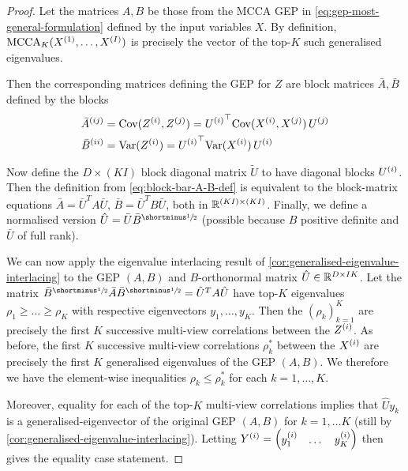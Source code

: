 \begin{proof}
    Let the matrices $A,B$ be those from the MCCA GEP in \cref{eq:gep-most-general-formulation} defined by the input variables $X$. By definition, $\operatorname{MCCA}_K(X^{(1)},\dots, X^{(I)})$ is precisely the vector of the top-$K$ such generalised eigenvalues.

    Then the corresponding matrices defining the GEP for $Z$ are block matrices $\bar{A}, \bar{B}$ defined by the blocks
    \begin{equation}\label{eq:block-bar-A-B-def}
    \begin{aligned}
        \bar{A}^{(ij)} &= \Cov(Z\sps{i}, Z\sps{j}) = {U\sps{i}}^\top \Cov(X\sps{i}, X\sps{j}) \, U\sps{j} \\ %
        \bar{B}^{(ii)} &= \Var(Z\sps{i}) = {U\sps{i}}^\top \Var(X\sps{i}) \, U\sps{i}
    \end{aligned}
    \end{equation}

    Now define the $D \times (K I)$ block diagonal matrix $\tilde{U}$ to have diagonal blocks $U^{(i)}$.
    Then the definition from \cref{eq:block-bar-A-B-def} is equivalent to the block-matrix equations $\bar{A} = \bar{U}^T A \bar{U}$, $\bar{B} = \bar{U}^T B \bar{U}$, both in $\mathbb{R}^{(KI)\times(KI)}$.
    Finally, we define a normalised version $\hat{U} = \bar{U} \bar{B}^\mhalf $ (possible because $B$ positive definite and $\bar{U}$ of full rank).

    We can now apply the eigenvalue interlacing result of \cref{cor:generalised-eigenvalue-interlacing} to the GEP $(A,B)$ and $B$-orthonormal matrix $\hat{U} \in \mathbb{R}^{D \times I K}$.
    Let the matrix $\bar{B}^\mhalf \bar{A} \bar{B}^\mhalf = \hat{U}^T A \hat{U}$ have top-$K$ eigenvalues $\rho_1\geq \dots \geq \rho_K$ with respective eigenvectors $y_1, \dots, y_K$.
    Then the $(\rho_k)_{k=1}^K$ are precisely the first $K$ successive multi-view correlations between the $Z^{(i)}$.
    As before, the first $K$ successive multi-view correlations $\rho^*_k$ between the $X^{(i)}$ are precisely the first $K$ generalised eigenvalues of the GEP $(A,B)$.
    We therefore we have the element-wise inequalities $\rho_k \leq \rho_k^*$ for each $k = 1, \dots, K$.

    Moreover, equality for each of the top-$K$ multi-view correlations implies that $\hat{U} y_k$ is a generalised-eigenvector of the original GEP $(A,B)$ for $k=1,\dots K$ (still by \cref{cor:generalised-eigenvalue-interlacing}).
    Letting $Y^{(i)} = \begin{pmatrix}y^{(i)}_1 & \dots & y^{(i)}_K\end{pmatrix}$ then gives the equality case statement.

\end{proof}